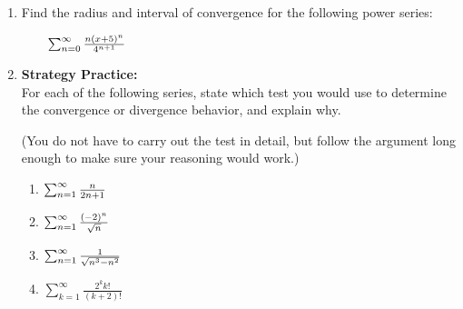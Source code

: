 \documentclass[10pt]{article}
\begin{document}
\begin{enumerate}
\item Find the radius and interval of convergence for the following power series:

\(\qquad \sum_{n=0}^\infty \frac{n(x+5)^n}{4^{n+1}}\)
\vfill

%
%
%
%
%
%
%
%
%
\vfill

\item \textbf{Strategy Practice:}\\
For each of the following series, state which test you would use to determine the convergence or divergence behavior, and explain why.

(You do not have to carry out the test in detail, but follow the argument long enough to make sure your reasoning would work.)

\begin{enumerate}

\item \(\sum_{n=1}^\infty \frac{n}{2n+1}\)\vspace*{.75in}

\item \(\sum_{n=1}^\infty \frac{(-2)^n}{\sqrt{n}}\)\vspace*{.75in}

\item \(\sum_{n=1}^\infty \frac{1}{\sqrt{n^3-n^2}}\)\vspace*{.75in}

\item \(\sum_{k=1}^\infty \frac{2^k k!}{(k+2)!}\)\vspace*{.75in}

\vfill

\end{enumerate}


\end{enumerate}
\end{document}
